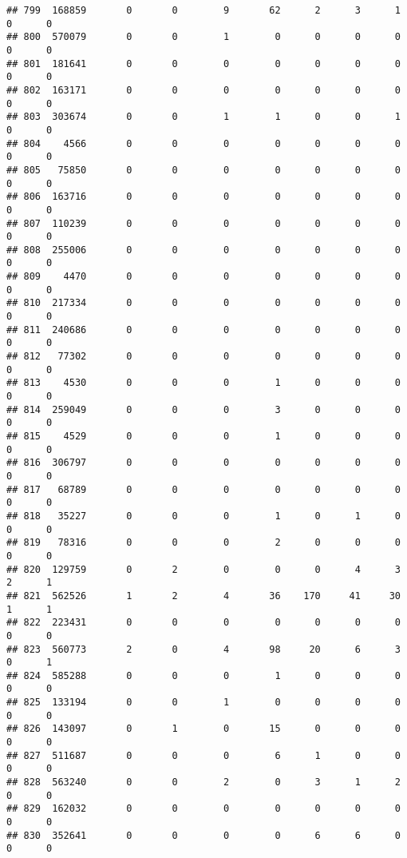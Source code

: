\documentclass[
]{article}
\begin{document}
\begin{verbatim}
## 799  168859       0       0        9       62      2      3      1     0      0
## 800  570079       0       0        1        0      0      0      0     0      0
## 801  181641       0       0        0        0      0      0      0     0      0
## 802  163171       0       0        0        0      0      0      0     0      0
## 803  303674       0       0        1        1      0      0      1     0      0
## 804    4566       0       0        0        0      0      0      0     0      0
## 805   75850       0       0        0        0      0      0      0     0      0
## 806  163716       0       0        0        0      0      0      0     0      0
## 807  110239       0       0        0        0      0      0      0     0      0
## 808  255006       0       0        0        0      0      0      0     0      0
## 809    4470       0       0        0        0      0      0      0     0      0
## 810  217334       0       0        0        0      0      0      0     0      0
## 811  240686       0       0        0        0      0      0      0     0      0
## 812   77302       0       0        0        0      0      0      0     0      0
## 813    4530       0       0        0        1      0      0      0     0      0
## 814  259049       0       0        0        3      0      0      0     0      0
## 815    4529       0       0        0        1      0      0      0     0      0
## 816  306797       0       0        0        0      0      0      0     0      0
## 817   68789       0       0        0        0      0      0      0     0      0
## 818   35227       0       0        0        1      0      1      0     0      0
## 819   78316       0       0        0        2      0      0      0     0      0
## 820  129759       0       2        0        0      0      4      3     2      1
## 821  562526       1       2        4       36    170     41     30     1      1
## 822  223431       0       0        0        0      0      0      0     0      0
## 823  560773       2       0        4       98     20      6      3     0      1
## 824  585288       0       0        0        1      0      0      0     0      0
## 825  133194       0       0        1        0      0      0      0     0      0
## 826  143097       0       1        0       15      0      0      0     0      0
## 827  511687       0       0        0        6      1      0      0     0      0
## 828  563240       0       0        2        0      3      1      2     0      0
## 829  162032       0       0        0        0      0      0      0     0      0
## 830  352641       0       0        0        0      6      6      0     0      0

\end{verbatim}
\end{document}
